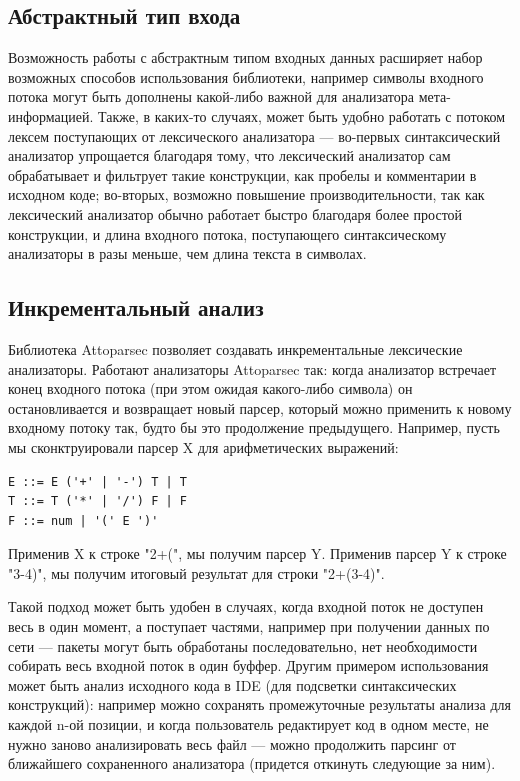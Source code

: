 \documentclass[14pt]{matmex-diploma}
\begin{document}
\subsection{Абстрактный тип входа}

Возможность работы с абстрактным типом входных данных расширяет набор возможных способов использования библиотеки, 
например символы входного потока могут быть дополнены какой-либо важной для анализатора мета-информацией.
Также, в каких-то случаях, может быть удобно работать с потоком лексем поступающих от лексического анализатора --- 
во-первых синтаксический анализатор упрощается благодаря тому,
что лексический анализатор сам обрабатывает и фильтрует такие конструкции, 
как пробелы и комментарии в исходном коде; во-вторых, возможно повышение 
производительности, так как лексический анализатор обычно работает 
быстро благодаря более простой конструкции, и длина входного потока, 
поступающего синтаксическому анализаторы в разы меньше, чем длина текста в символах.

\subsection{Инкрементальный анализ}
Библиотека Attoparsec позволяет создавать инкрементальные лексические 
анализаторы. Работают анализаторы Attoparsec так: когда анализатор встречает конец входного потока (при этом ожидая 
какого-либо символа) он остановливается и возвращает новый парсер, 
который можно применить к новому входному потоку так, будто бы это 
продолжение предыдущего. Например, пусть мы сконктруировали парсер X 
для арифметических выражений:
\begin{lstlisting}
E ::= E ('+' | '-') T | T
T ::= T ('*' | '/') F | F
F ::= num | '(' E ')' 
\end{lstlisting}
Применив X к строке "2+(", мы получим парсер Y. 
Применив парсер Y к строке "3-4)", мы получим итоговый результат для строки "2+(3-4)". 

Такой подход может быть удобен в случаях, когда входной поток не доступен 
весь в один момент, а поступает частями, например при получении данных по сети --- 
пакеты могут быть обработаны последовательно, нет необходимости собирать весь 
входной поток в один буффер.
Другим примером использования может быть анализ исходного кода в IDE 
(для подсветки синтаксических конструкций): например можно сохранять 
промежуточные результаты анализа для каждой n-ой позиции, и когда 
пользователь редактирует код в одном месте, не нужно заново анализировать 
весь файл --- можно продолжить парсинг от ближайшего сохраненного 
анализатора (придется откинуть следующие за ним).
\end{document}
